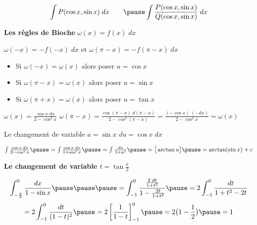 \begin{frame}
$$\int P(\cos x,\sin x)\;dx \qquad\pause \int \frac{P(\cos x,\sin x)}{Q(\cos x, \sin x)}\;dx$$

\pause

\textbf{Les règles de Bioche} \pause \quad $\omega(x) = f(x)\;dx$

\pause

\centerline{$\omega(-x)=-f(-x)\;dx$ \pause et $\omega (\pi-x)=-f(\pi-x)\;dx$}

\pause
\medskip

\begin{itemize}
  \item Si $\omega(-x)=\omega(x)$ \pause alors poser $u=\cos x$
\pause
  \item Si $\omega(\pi-x)=\omega(x)$ alors poser $u=\sin x$
\pause
  \item Si $\omega(\pi + x)=\omega(x)$ alors poser $u=\tan x$
\end{itemize}

\pause
\medskip

\begin{exemple}
\pause
$\omega(x)= \frac{\cos x \; dx}{2-\cos^2 x}$ 
\pause
\hfill
$\omega(\pi-x)=\frac{\cos(\pi-x) \; d(\pi-x)}{2-\cos^2 (\pi-x)} = \frac{(-\cos x) \; (-dx)}{2-\cos^2 x} 
= \omega(x)$ 

\pause
\medskip

Le changement de variable  $u = \sin x$
\pause
\hfil $du= \cos x \; dx$

\pause
\medskip
$
\int \frac{\cos x \; dx}{2-\cos^2 x}
\pause
= \int \frac{\cos x \; dx}{1+\sin^2 x}
\pause
= \int \frac{du}{1+u^2} 
\pause
= \big[ \arctan u \big] 
\pause
= \arctan (\sin x) + c
$
\end{exemple}
\end{frame}


\begin{frame}

\textbf{Le changement de variable $\displaystyle t=\tan \frac x2$}

\pause

\pause
\begin{exemple}

 



$$\int_{-\frac\pi2}^0 \frac{dx}{1-\sin x} \pause\pause\pause
= \int_{-1}^0 \frac{\frac{2\;dt}{1+t^2}}{1-\frac{2t}{1+t^2}} \pause
= 2\int_{-1}^0 \frac{dt}{1+t^2-2t} $$
\pause
$$
= 2\int_{-1}^0 \frac{dt}{(1-t)^2} \pause
= 2 \left[\frac{1}{1-t}\right]_{-1}^0\pause
= 2\big(1-\frac12\big)\pause
= 1$$
 
\end{exemple}

\end{frame}



